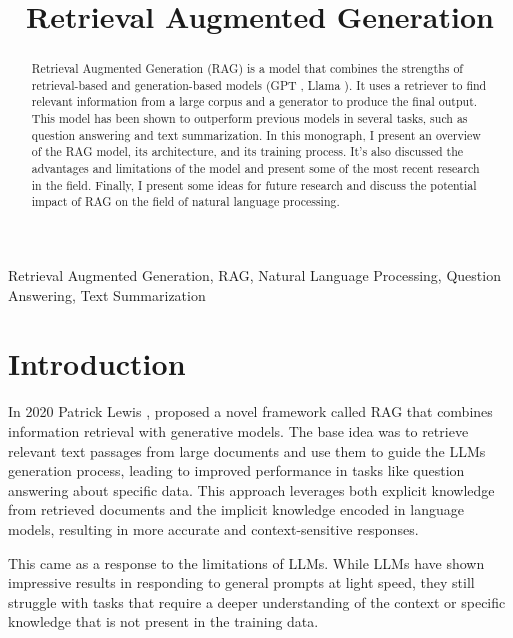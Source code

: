 \documentclass[conference]{IEEEtran}
\begin{document}
\title{Retrieval Augmented Generation}

\author{
    }

\maketitle

\begin{abstract}
    Retrieval Augmented Generation (RAG) is a model that combines the strengths of retrieval-based and generation-based models (GPT \cite{noauthor_chatgpt_nodate}, Llama \cite{noauthor_llama_nodate}).
    It uses a retriever to find relevant information from a large corpus and a generator to produce the final output.
    This model has been shown to outperform previous models in several tasks, such as question answering and text summarization.
    In this monograph, I present an overview of the RAG model, its architecture, and its training process.
    It's also discussed the advantages and limitations of the model and present some of the most recent research in the field.
    Finally, I present some ideas for future research and discuss the potential impact of RAG on the field of natural language processing.
\end{abstract}

\begin{IEEEkeywords}
    Retrieval Augmented Generation, RAG, Natural Language Processing, Question Answering, Text Summarization
\end{IEEEkeywords}

\section{Introduction}
In 2020 Patrick Lewis \cite{lewis_retrieval-augmented_2021}, proposed a novel framework called RAG
that combines information retrieval with generative models. The base idea was to retrieve relevant text passages
from large documents and use them to guide the LLMs generation process, leading to improved performance
in tasks like question answering about specific data. This approach leverages both explicit knowledge from retrieved
documents and the implicit knowledge encoded in language models, resulting in more accurate and
context-sensitive responses.

This came as a response to the limitations of LLMs. While LLMs have shown impressive results in
responding to general prompts at light speed, they still struggle with tasks
that require a deeper understanding of the context or specific knowledge that is not present in the training data.
\end{document}
